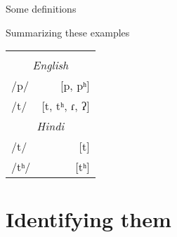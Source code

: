 \documentclass{beamer}
\newcommand{\subonethree}{Some definitions}
\begin{document}
\begin{frame}{\subonethree}
{\begin{block}{Summarizing these examples}
\begin{tabular}{l r}
            \hline \\
            \multicolumn{2}{c}{\emph{English}} \\
            /p/                       & [p, pʰ] \\
            /t/                       & [t, tʰ, ɾ, ʔ] \\
            \multicolumn{2}{c}{\emph{Hindi}} \\
            /t/                       & [t] \\
            /tʰ/                      & [tʰ]
            \end{tabular}
          \end{block}
        }
      \end{frame}

  \section{Identifying them}
\end{document}
